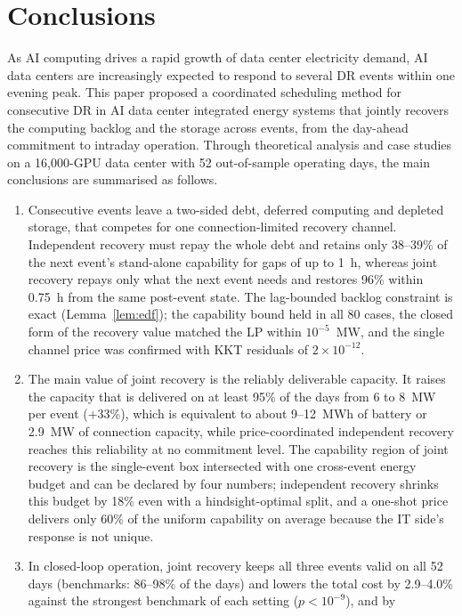 \section{Conclusions}
\label{sec:conclusion}

As AI computing drives a rapid growth of data center electricity demand, AI data centers are increasingly expected to
respond to several DR events within one evening peak. This paper proposed a coordinated scheduling method for
consecutive DR in AI data center integrated energy systems that jointly recovers the computing backlog and the storage
across events, from the day-ahead commitment to intraday operation. Through theoretical analysis and case studies on a
16,000-GPU data center with 52 out-of-sample operating days, the main conclusions are summarised as follows.
\begin{enumerate}[label=(\arabic*),leftmargin=1.9em,itemsep=1.5pt]
\item Consecutive events leave a two-sided debt, deferred computing and depleted storage, that competes for one
connection-limited recovery channel. Independent recovery must repay the whole debt and retains only 38--39\% of the
next event's stand-alone capability for gaps of up to 1~h, whereas joint recovery repays only what the next event needs
and restores 96\% within 0.75~h from the same post-event state. The lag-bounded backlog constraint is exact
(Lemma~\ref{lem:edf}); the capability bound held in all 80 cases, the closed form of the recovery value matched the LP
within $10^{-5}$~MW, and the single channel price was confirmed with KKT residuals of $2\times10^{-12}$.
\item The main value of joint recovery is the reliably deliverable capacity. It raises the capacity that is delivered on
at least 95\% of the days from 6 to 8~MW per event (+33\%), which is equivalent to about 9--12~MWh of battery or 2.9~MW
of connection capacity, while price-coordinated independent recovery reaches this reliability at no commitment level.
The capability region of joint recovery is the single-event box intersected with one cross-event energy budget and can
be declared by four numbers; independent recovery shrinks this budget by 18\% even with a hindsight-optimal split, and a
one-shot price delivers only 60\% of the uniform capability on average because the IT side's response is not unique.
\item In closed-loop operation, joint recovery keeps all three events valid on all 52 days (benchmarks: 86--98\% of the
days) and lowers the total cost by 2.9--4.0\% against the strongest benchmark of each setting ($p<10^{-9}$), and by

\end{enumerate}
